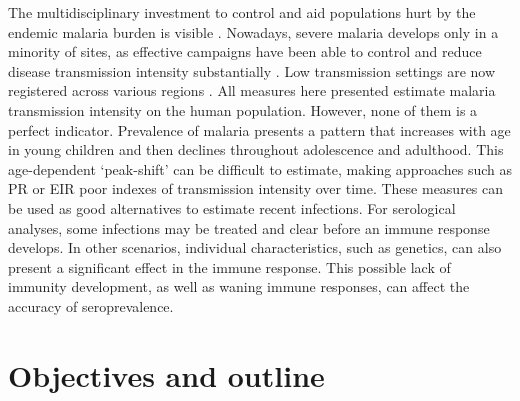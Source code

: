 The multidisciplinary investment to control and aid populations hurt by the endemic malaria burden is visible \cite{who2017world}.
Nowadays, severe malaria develops only in a minority of sites, as effective campaigns have been able to control and reduce disease transmission intensity substantially \cite{marsh1995indicators}.
Low transmission settings are now registered across various regions \cite{cook2010using}.
All measures here presented estimate malaria transmission intensity on the human population.
However, none of them is a perfect indicator.
Prevalence of malaria presents a pattern that increases with age in young children and then declines throughout adolescence and adulthood.
This age-dependent `peak-shift' can be difficult to estimate, making approaches such as PR or EIR poor indexes of transmission intensity over time.
These measures can be used as good alternatives to estimate recent infections.
For serological analyses, some infections may be treated and clear before an immune response develops.
In other scenarios, individual characteristics, such as genetics, can also present a significant effect in the immune response.
This possible lack of immunity development, as well as waning immune responses, can affect the accuracy of seroprevalence.



\section{Objectives and outline}
\label{seq:objectives}

